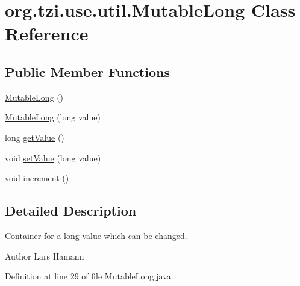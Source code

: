 \hypertarget{classorg_1_1tzi_1_1use_1_1util_1_1_mutable_long}{\section{org.\-tzi.\-use.\-util.\-Mutable\-Long Class Reference}
\label{classorg_1_1tzi_1_1use_1_1util_1_1_mutable_long}
}
\subsection*{Public Member Functions}
\begin{DoxyCompactItemize}
\item 
\hyperlink{classorg_1_1tzi_1_1use_1_1util_1_1_mutable_long_afd3ac30040fca9757fea01ff089991e3}{Mutable\-Long} ()
\item 
\hyperlink{classorg_1_1tzi_1_1use_1_1util_1_1_mutable_long_abef4cf94d7b526092a767425081851df}{Mutable\-Long} (long value)
\item 
long \hyperlink{classorg_1_1tzi_1_1use_1_1util_1_1_mutable_long_a119070ebdd9e3a2433fe196d5dd157bd}{get\-Value} ()
\item 
void \hyperlink{classorg_1_1tzi_1_1use_1_1util_1_1_mutable_long_a3ae1c117bcc0dc0ac95dd1141c4ba7eb}{set\-Value} (long value)
\item 
void \hyperlink{classorg_1_1tzi_1_1use_1_1util_1_1_mutable_long_af379bc9862ec6bc7a30d4133880b2d2b}{increment} ()
\end{DoxyCompactItemize}


\subsection{Detailed Description}
Container for a long value which can be changed. \begin{DoxyAuthor}{Author}
Lars Hamann 
\end{DoxyAuthor}


Definition at line 29 of file Mutable\-Long.\-java.



